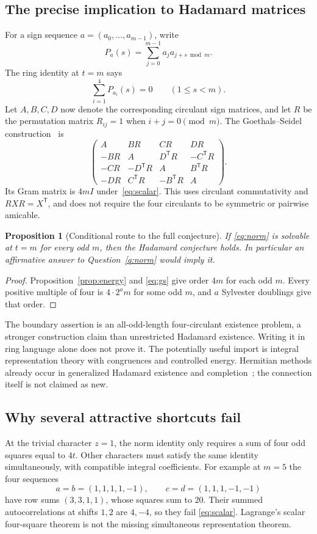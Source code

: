 \documentclass[11pt]{article}
\newtheorem{proposition}{Proposition}[section]
\begin{document}
\subsection{The precise implication to Hadamard matrices}
For a sign sequence $a=(a_0,\ldots,a_{m-1})$, write
\[
 P_a(s)=\sum_{j=0}^{m-1}a_ja_{j+s\bmod m}.
\]
The ring identity at $t=m$ says
\begin{equation}\label{eq:scalar}
 \sum_{i=1}^4P_{a_i}(s)=0\qquad(1\le s<m).
\end{equation}
Let $A,B,C,D$ now denote the corresponding circulant sign matrices, and
let $R$ be the permutation matrix $R_{ij}=1$ when $i+j=0\pmod m$.
The Goethals--Seidel construction~\cite[Theorem 3]{Survey} is
\begin{equation}\label{eq:gs}
 \begin{pmatrix}
 A&BR&CR&DR\\
 -BR&A&D^{\mathsf T}R&-C^{\mathsf T}R\\
 -CR&-D^{\mathsf T}R&A&B^{\mathsf T}R\\
 -DR&C^{\mathsf T}R&-B^{\mathsf T}R&A
 \end{pmatrix}.
\end{equation}
Its Gram matrix is $4mI$ under~\eqref{eq:scalar}. This uses circulant
commutativity and $RXR=X^{\mathsf T}$, and does not require the four
circulants to be symmetric or pairwise amicable.

\begin{proposition}[Conditional route to the full conjecture]
If \eqref{eq:norm} is solvable at $t=m$ for every odd $m$, then the
Hadamard conjecture holds. In particular an affirmative answer to
Question~\ref{q:norm} would imply it.
\end{proposition}
\begin{proof}
Proposition~\ref{prop:energy} and \eqref{eq:gs} give order $4m$ for each
odd $m$. Every positive multiple of four is $4\cdot2^a m$ for some
odd $m$, and $a$ Sylvester doublings give that order.
\end{proof}

The boundary assertion is an all-odd-length four-circulant existence
problem, a stronger construction claim than unrestricted Hadamard
existence. Writing it in ring language alone does not prove it.
The potentially useful import is integral representation theory with
congruences and controlled energy.
Hermitian methods already occur in generalized Hadamard existence and
completion~\cite{Brock}; the connection itself is not claimed as new.

\subsection{Why several attractive shortcuts fail}
At the trivial character $z=1$, the norm identity only requires a sum
of four odd squares equal to $4t$. Other characters must satisfy the
same identity simultaneously, with compatible integral coefficients.
For example at $m=5$ the four sequences
\[
 a=b=(1,1,1,1,-1),\qquad c=d=(1,1,1,-1,-1)
\]
have row sums $(3,3,1,1)$, whose squares sum to $20$. Their summed
autocorrelations at shifts $1,2$ are $4,-4$, so they fail
\eqref{eq:scalar}. Lagrange's scalar four-square theorem is not the
missing simultaneous representation theorem.
\end{document}
